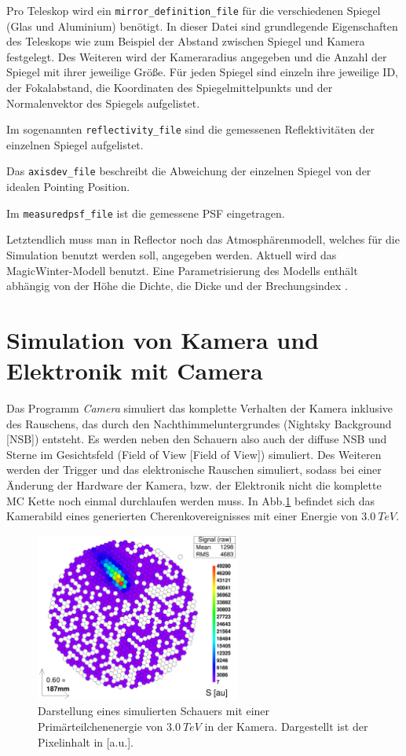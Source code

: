 Pro Teleskop wird ein \texttt{mirror\_definition\_file} für die verschiedenen Spiegel (Glas und Aluminium) benötigt.
In dieser Datei sind grundlegende Eigenschaften des Teleskops wie zum Beispiel der Abstand zwischen Spiegel und Kamera festgelegt. 
Des Weiteren wird der Kameraradius angegeben und die Anzahl der Spiegel mit ihrer jeweilige Größe.
Für jeden Spiegel sind einzeln ihre jeweilige ID, der Fokalabstand, die Koordinaten des Spiegelmittelpunkts und der Normalenvektor des Spiegels aufgelistet.

Im sogenannten \texttt{reflectivity\_file} sind die gemessenen Reflektivitäten der einzelnen Spiegel aufgelistet.

Das \texttt{axisdev\_file} beschreibt die Abweichung der einzelnen Spiegel von der idealen Pointing Position.

Im \texttt{measuredpsf\_file} ist die gemessene PSF eingetragen.

Letztendlich muss man in Reflector noch das Atmosphärenmodell, welches für die Simulation benutzt werden soll, angegeben werden. 
Aktuell wird das MagicWinter-Modell benutzt. 
Eine Parametrisierung des Modells enthält abhängig von der Höhe die Dichte, die Dicke und der Brechungsindex \cite{Haffke}.


\section{Simulation von Kamera und Elektronik mit Camera}
\label{sec:Camera}
Das Programm \textit{Camera} simuliert das komplette Verhalten der Kamera inklusive des Rauschens, das durch den Nachthimmeluntergrundes (Nightsky Background [NSB]) entsteht.
Es werden neben den Schauern also auch der diffuse NSB und Sterne im Gesichtsfeld (Field of View [Field of View]) simuliert. 
Des Weiteren werden der Trigger und das elektronische Rauschen simuliert, sodass bei einer Änderung der Hardware der Kamera, bzw. der Elektronik nicht die komplette MC Kette noch einmal durchlaufen werden muss.
In Abb.\ref{Kamera-Bild} befindet sich das Kamerabild eines generierten Cherenkovereignisses mit einer Energie von $\SI{3.0}{TeV}$.

\begin{figure}
    \centering
    \includegraphics[width=0.6\textwidth]{./Plots/03_MonteCarlos/Signal_Job481_RunNr1513276_511_e3.0TeV_Zd32.2_fertig.png}
    \caption{Darstellung eines simulierten Schauers mit einer Primärteilchenenergie von $\SI{3.0}{TeV}$ in der Kamera. Dargestellt ist der Pixelinhalt in [a.u.].}
    \label{Kamera-Bild}
\end{figure}

